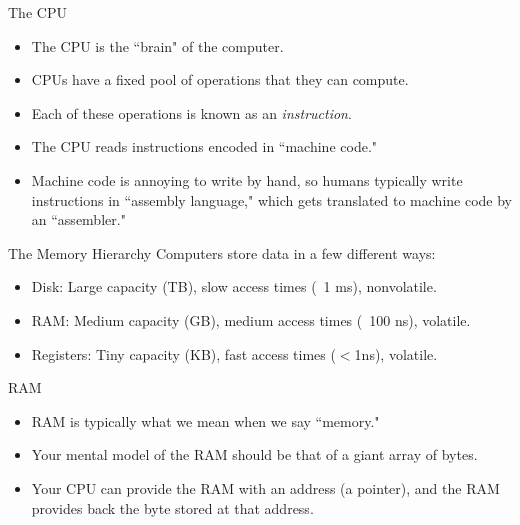 \documentclass[hyphens,aspectratio=169,dvipsnames]{beamer}
\begin{document}
\begin{frame}[fragile]{The CPU}
    \begin{itemize}
        \pause \item The CPU is the ``brain" of the computer.
        \pause \item CPUs have a fixed pool of operations that they can compute.
        \pause \item Each of these operations is known as an \textit{instruction}.
        \pause \item The CPU reads instructions encoded in ``machine code."
        \pause \item Machine code is annoying to write by hand, so humans typically write instructions in ``assembly language," which gets translated to machine code by an ``assembler."
    \end{itemize}
\end{frame}

\begin{frame}[fragile]{The Memory Hierarchy}
    Computers store data in a few different ways:
    \begin{itemize}
        \pause \item Disk: Large capacity (TB), slow access times (~1 ms), nonvolatile.
        \pause \item RAM: Medium capacity (GB), medium access times (~100 ns), volatile.
        \pause \item Registers: Tiny capacity (KB), fast access times ($<$1ns), volatile.
    \end{itemize}
\end{frame}

\begin{frame}[fragile]{RAM}
    \begin{itemize}
        \pause \item RAM is typically what we mean when we say ``memory."
        \pause \item Your mental model of the RAM should be that of a giant array of bytes.
        \pause \item Your CPU can provide the RAM with an address (a pointer), and the RAM provides back the byte stored at that address.
    \end{itemize}
\end{frame}
\end{document}
